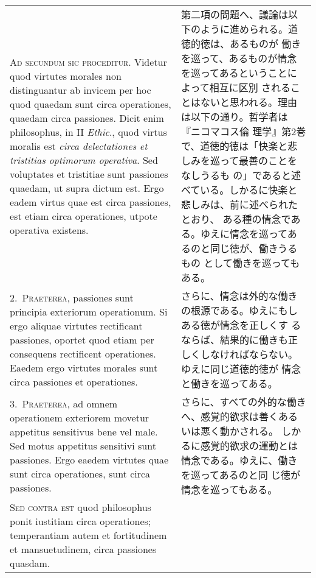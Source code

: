 \documentclass[10pt]{jsarticle}
\begin{document}
\begin{longtable}{p{21em}p{21em}}
 {\scshape Ad secundum sic proceditur}. Videtur quod virtutes morales
 non distinguantur ab invicem per hoc quod quaedam sunt circa
 operationes, quaedam circa passiones. Dicit enim philosophus, in II
 {\itshape Ethic}., quod virtus moralis est {\itshape circa
 delectationes et tristitias optimorum operativa}. Sed voluptates et
 tristitiae sunt passiones quaedam, ut supra dictum est. Ergo eadem
 virtus quae est circa passiones, est etiam circa operationes, utpote
 operativa existens.

 &

 第二項の問題へ、議論は以下のように進められる。道徳的徳は、あるものが
 働きを巡って、あるものが情念を巡ってあるということによって相互に区別
 されることはないと思われる。理由は以下の通り。哲学者は『ニコマコス倫
 理学』第2巻で、道徳的徳は「快楽と悲しみを巡って最善のことをなしうるも
 の」であると述べている。しかるに快楽と悲しみは、前に述べられたとおり、
 ある種の情念である。ゆえに情念を巡ってあるのと同じ徳が、働きうるもの
 として働きを巡ってもある。
 
\\



2.~{\scshape Praeterea}, passiones sunt principia exteriorum
operationum. Si ergo aliquae virtutes rectificant passiones, oportet
quod etiam per consequens rectificent operationes. Eaedem ergo
virtutes morales sunt circa passiones et operationes.

 &

さらに、情念は外的な働きの根源である。ゆえにもしある徳が情念を正しくす
るならば、結果的に働きも正しくしなければならない。ゆえに同じ道徳的徳が
情念と働きを巡ってある。
 
\\



 3.~{\scshape Praeterea}, ad omnem operationem exteriorem movetur
 appetitus sensitivus bene vel male. Sed motus appetitus sensitivi
 sunt passiones. Ergo eaedem virtutes quae sunt circa operationes,
 sunt circa passiones.

 &

さらに、すべての外的な働きへ、感覚的欲求は善くあるいは悪く動かされる。
しかるに感覚的欲求の運動とは情念である。ゆえに、働きを巡ってあるのと同
じ徳が情念を巡ってもある。
 
\\



 {\scshape Sed contra est} quod philosophus ponit iustitiam circa
 operationes; temperantiam autem et fortitudinem et mansuetudinem,
 circa passiones quasdam.


\end{longtable}
\end{document}
